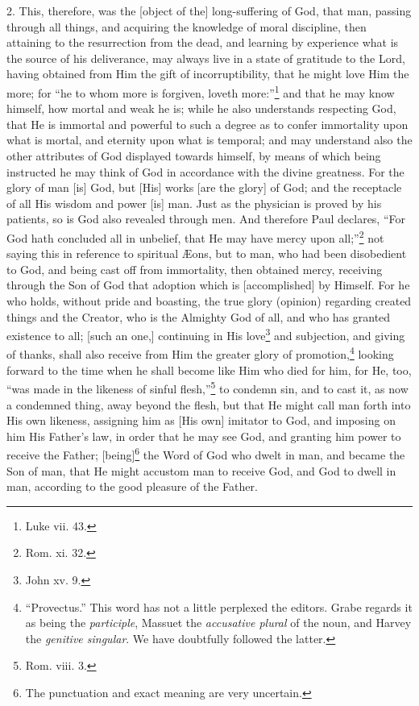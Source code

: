 2. This, therefore, was the [object of the] long-suffering of God, that man, passing through all things, and acquiring the knowledge of moral discipline, then attaining to the resurrection from the dead, and learning by experience what is the source of his deliverance, may always live in a state of gratitude to the Lord, having obtained from Him the gift of incorruptibility, that he might love Him the more; for “he to whom more is forgiven, loveth more:”\footnote{Luke vii. 43.} and that he may know himself, how mortal and weak he is; while he also understands respecting God, that He is immortal and powerful to such a degree as to confer immortality upon what is mortal, and eternity upon what is temporal; and may understand also the other attributes of God displayed towards himself, by means of which being instructed he may think of God in accordance with the divine greatness. For the glory of man [is] God, but [His] works [are the glory] of God; and the receptacle of all His wisdom and power [is] man. Just as the physician is proved by his patients, so is God also revealed through men. And therefore Paul declares, “For God hath concluded all in unbelief, that He may have mercy upon all;”\footnote{Rom. xi. 32.} not saying this in reference to spiritual Æons, but to man, who had been disobedient to God, and being cast off from immortality, then obtained mercy, receiving through the Son of God that adoption which is [accomplished] by Himself. For he who holds, without pride and boasting, the true glory (opinion) regarding created things and the Creator, who is the Almighty God of all, and who has granted existence to all; [such an one,] continuing in His love\footnote{John xv. 9.} and subjection, and giving of thanks, shall also receive from Him the greater glory of promotion,\footnote{“Provectus.” This word has not a little perplexed the editors. Grabe regards it as being the \emph{participle}, Massuet the \emph{accusative plural} of the noun, and Harvey the \emph{genitive singular}. We have doubtfully followed the latter.} looking forward to the time when he shall become like Him who died for him, for He, too, “was made in the likeness of sinful flesh,”\footnote{Rom. viii. 3.} to condemn sin, and to cast it, as now a condemned thing, away beyond the flesh, but that He might call man forth into His own likeness, assigning him as [His own] imitator to God, and imposing on him His Father’s law, in order that he may see God, and granting him power to receive the Father; [being]\footnote{The punctuation and exact meaning are very uncertain.} the Word of God who dwelt in man, and became the Son of man, that He might accustom man to receive God, and God to dwell in man, according to the good pleasure of the Father.

